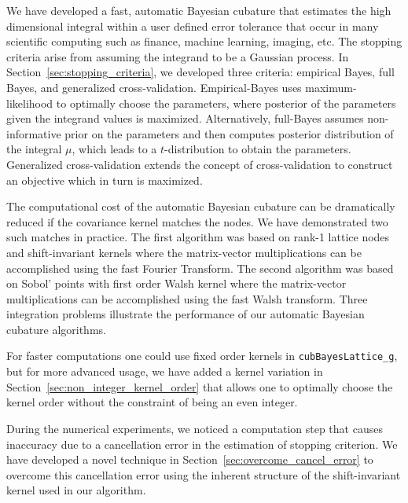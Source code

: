 \documentclass{iitthesis}          %
\newcommand{\code}[1]{\texttt{#1}}
\newcommand\secref{Section~\ref}
\begin{document}
{{{{{{\fi






\label{sec:conclusion-future-work}


We have developed a fast, automatic Bayesian cubature that estimates the high dimensional integral within a user defined error tolerance  that occur in many scientific computing such as finance, machine learning, imaging, etc.  The stopping criteria arise from assuming the integrand to be a Gaussian process.  In \secref{sec:stopping_criteria}, we developed three criteria:  empirical Bayes, full Bayes, and generalized cross-validation.  Empirical-Bayes uses maximum-likelihood to optimally choose the parameters, where posterior of the parameters given the integrand values is maximized. Alternatively, full-Bayes assumes non-informative prior on the parameters and then computes posterior distribution of the integral $\mu$, which leads to a $t$-distribution to obtain the parameters. Generalized cross-validation extends the concept of cross-validation to construct an objective which in turn is maximized.

The computational cost of the automatic Bayesian cubature can be dramatically reduced if the covariance kernel matches the nodes.  We have demonstrated two such matches in practice. The first algorithm was based on rank-1 lattice nodes and shift-invariant kernels where the matrix-vector multiplications can be accomplished using the fast Fourier Transform.  The second algorithm was based on Sobol' points with first order Walsh kernel where the matrix-vector multiplications can be accomplished using the fast Walsh transform. Three integration problems illustrate the performance of our automatic Bayesian cubature algorithms.  

For faster computations one could use fixed order kernels in \code{cubBayesLattice\_g}, but for more advanced usage, we have added a kernel variation in \secref{sec:non_integer_kernel_order} that allows one to optimally choose the kernel order without the constraint of being an even integer.

During the numerical experiments, we noticed a computation step that causes inaccuracy due to a cancellation error in the estimation of stopping criterion.
We have developed a novel technique in \secref{sec:overcome_cancel_error} to overcome this cancellation error using the inherent structure of the shift-invariant kernel used in our algorithm.

}}}}}}
\end{document}
